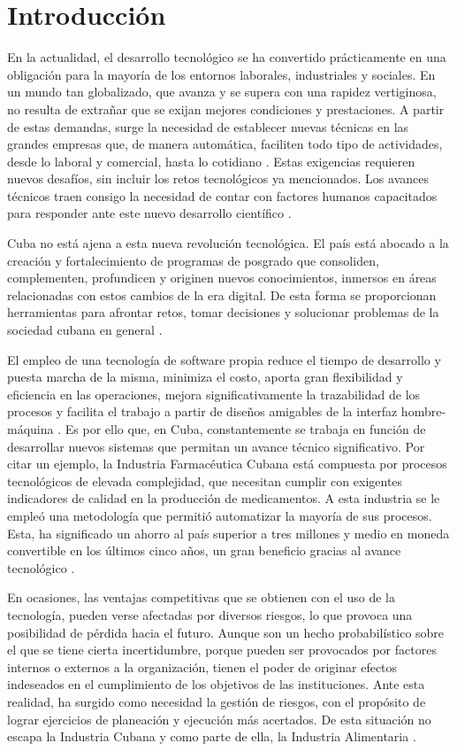 \chapter*{Introducción}
En la actualidad, el desarrollo tecnológico se ha convertido prácticamente en una obligación para la mayoría de los entornos laborales, industriales y sociales. En un mundo tan globalizado, que avanza y se supera con una rapidez vertiginosa, no resulta de extrañar que se exijan mejores condiciones y prestaciones. A partir de estas demandas, surge la necesidad de establecer nuevas técnicas en las grandes empresas que, de manera automática, faciliten todo tipo de actividades, desde lo laboral y comercial, hasta lo cotidiano \cite{avanceTecnologico}. 
Estas exigencias requieren nuevos desafíos, sin incluir los retos tecnológicos ya mencionados. Los avances técnicos traen consigo la necesidad de contar con factores humanos capacitados para responder ante este nuevo desarrollo científico \cite{invstCibernCuba}. 

Cuba no está ajena a esta nueva revolución tecnológica. El país está abocado a la creación y fortalecimiento de programas de posgrado que consoliden, complementen, profundicen y originen nuevos conocimientos, inmersos en áreas relacionadas con estos cambios de la era digital. De esta forma se proporcionan herramientas para afrontar retos, tomar decisiones y solucionar problemas de la sociedad cubana en general \cite{avanceTecnologico}.

El empleo de una tecnología de software propia reduce el tiempo de desarrollo y puesta marcha de la misma, minimiza el costo, aporta gran flexibilidad y eficiencia en las operaciones, mejora significativamente la trazabilidad de los procesos y facilita el trabajo a partir de diseños amigables de la interfaz hombre-máquina \cite{industriaCubana}.
Es por ello que, en Cuba, constantemente se trabaja en función de desarrollar nuevos sistemas que permitan un avance técnico significativo.
Por citar un ejemplo, la Industria Farmacéutica Cubana está compuesta por procesos tecnológicos de elevada complejidad, que necesitan cumplir con exigentes indicadores de calidad en la producción de medicamentos. A esta industria se le empleó una metodología que permitió automatizar la mayoría de sus procesos. Esta, ha significado un ahorro al país superior a tres millones y medio en moneda convertible en los últimos cinco años, un gran beneficio gracias al avance tecnológico \cite{industriaFarmceutica}.

En ocasiones, las ventajas competitivas que se obtienen con el uso de la tecnología, pueden verse afectadas por diversos riesgos, lo que provoca una posibilidad de pérdida hacia el futuro. Aunque son un hecho probabilístico sobre el que se tiene cierta incertidumbre, porque pueden ser provocados por factores internos o externos a la organización, tienen el poder de originar efectos indeseados en el cumplimiento de los objetivos de las instituciones. 
Ante esta realidad, ha surgido como necesidad la gestión de riesgos, con el propósito de lograr ejercicios de planeación y ejecución más acertados.
De esta situación no escapa la Industria Cubana y como parte de ella, la Industria Alimentaria \cite{CONVENCION2019}.


